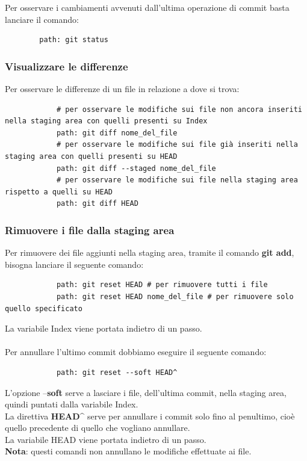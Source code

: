 	\noindent
	Per osservare i cambiamenti avvenuti dall'ultima operazione di commit basta lanciare il comando:
		\begin{verbatim}
		path: git status
		\end{verbatim}

	
		\subsubsection{Visualizzare le differenze} %
		\label{ssub:visualizzare_le_differenze}
		Per osservare le differenze di un file in relazione a dove si trova:
			\begin{verbatim}
			# per osservare le modifiche sui file non ancora inseriti nella staging area con quelli presenti su Index
			path: git diff nome_del_file
			# per osservare le modifiche sui file già inseriti nella staging area con quelli presenti su HEAD
			path: git diff --staged nome_del_file
			# per osservare le modifiche sui file nella staging area rispetto a quelli su HEAD
			path: git diff HEAD
			\end{verbatim}

		
		\subsubsection{Rimuovere i file dalla staging area} %
		\label{ssub:rimuovere_i_file_dalla_staging_area}
		Per rimuovere dei file aggiunti nella staging area, tramite il comando \textbf{git add}, bisogna lanciare il seguente comando:
			\begin{verbatim}
			path: git reset HEAD # per rimuovere tutti i file
			path: git reset HEAD nome_del_file # per rimuovere solo quello specificato
			\end{verbatim}
		\noindent
		La variabile Index viene portata indietro di un passo. \\ \\
		Per annullare l'ultimo commit dobbiamo eseguire il seguente comando:
			\begin{verbatim}
			path: git reset --soft HEAD^
			\end{verbatim}
		\noindent
		L'opzione --\textbf{soft} serve a lasciare i file, dell'ultima commit, nella staging area, quindi puntati dalla variabile Index. \\
		La direttiva \textbf{HEAD\^} serve per annullare i commit solo fino al penultimo, cioè quello precedente di quello che vogliano annullare. \\
		La variabile HEAD viene portata indietro di un passo. \\
		\textbf{Nota}: questi comandi non annullano le modifiche effettuate ai file. \\

